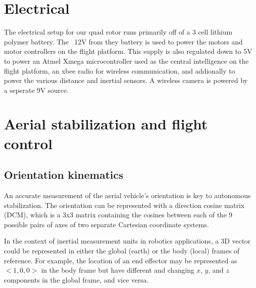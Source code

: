 \documentclass[12pt,letterpaper]{article}
\begin{document}
\section*{Electrical}

The electrical setup for our quad rotor runs primarily off of a 3 cell
lithium polymer battery. The ~12V from they battery is used to power the motors
and motor controllers on the flight platform. This supply is also regulated down
to 5V to power an Atmel Xmega microcontroller used as the central intelligence
on the flight platform, an xbee radio for wireless communication, and 
addionally to power the various distance and inertial sensors. A wireless camera
is powered by a seperate 9V source.


\section*{Aerial stabilization and flight control}

\subsection*{Orientation kinematics}

An accurate measurement of the aerial vehicle's orientation is key to
autonomous stabilization. The orientation can be represented with a direction
cosine matrix (DCM), which is a 3x3 matrix containing the cosines between each
of the 9 possible pairs of axes of two separate Cartesian coordinate systems.

In the context of inertial measurement units in robotics applications, a 3D
vector could be represented in either the global (earth) or the body (local)
frames of reference. For example, the location of an end effector may be
represented as $<1, 0, 0>$ in the body frame but have different and changing
$x$, $y$, and $z$ components in the global frame, and vice versa.
\end{document}
